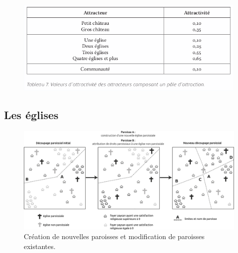 \documentclass[12pt, a4paper, oneside]{book}
\begin{document}
\begin{figure}[H]
	\centering
	\includegraphics[width=1\linewidth]{src/Chapitre_TMD/Tab7.png}
\end{figure}

	\subsection{Les églises}
	
	\begin{figure}[!h]
		\centering
		\includegraphics[width=1\linewidth]{src/Chapitre_TMD/Fig5}
		\caption{Création de nouvelles paroisses et modification de paroisses existantes.}
		\label{fig:fig5}
	\end{figure}
	
\end{document}
